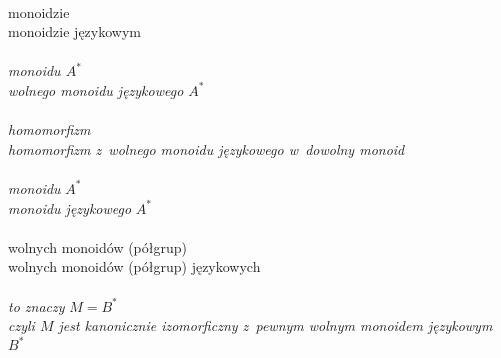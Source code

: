 \documentclass[a4paper,11pt]{article}
\begin{document}
 \\
\Jest  monoidzie \\
\Powin monoidzie językowym \\
 \\
\Jest  \textit{monoidu $A^{ * }$} \\
\Powin \textit{wolnego monoidu językowego $A^{ * }$} \\
 \\
\Jest  \textit{homomorfizm} \\
\Powin \textit{homomorfizm z~wolnego monoidu językowego w~dowolny monoid} \\
 \\
\Jest  \textit{monoidu} $A^{ * }$ \\
\Powin \textit{monoidu językowego} $A^{ * }$ \\
 \\
\Jest  wolnych monoidów (półgrup) \\
\Powin wolnych monoidów (półgrup) językowych \\
 \\
\Jest  \textit{to znaczy} $M = B^{ * }$ \\
\Powin \textit{czyli $M$ jest kanonicznie izomorficzny z~pewnym wolnym
  monoidem językowym $B^{ * }$} \\


\vspace{\spaceTwo}












{}






\end{document}
